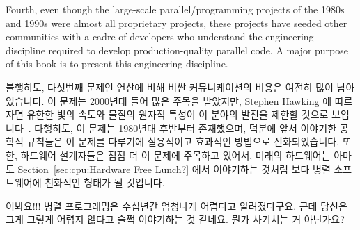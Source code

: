 Fourth, even though the large-scale parallel\-/programming projects of
the 1980s and 1990s were almost all proprietary projects, these
projects have seeded other communities with a cadre of developers who
understand the engineering discipline required to develop production-quality
parallel code.
A major purpose of this book is to present this engineering discipline.
\fi

불행히도, 다섯번째 문제인 연산에 비해 비싼 커뮤니케이션의 비용은 여전히 많이
남아있습니다.
이 문제는 2000년대 들어 많은 주목을 받았지만, Stephen Hawking 에 따르자면
유한한 빛의 속도와 물질의 원자적 특성이 이 분야의 발전을 제한할 것으로
보입니다~\cite{BryanGardiner2007,GordonMoore03a}.
다행히도, 이 문제는 1980년대 후반부터 존재했으며, 덕분에 앞서 이야기한 공학적
규칙들은 이 문제를 다루기에 실용적이고 효과적인 방법으로 진화되었습니다.
또한, 하드웨어 설계자들은 점점 더 이 문제에 주목하고 있어서, 미래의 하드웨어는
아마도 Section~\ref{sec:cpu:Hardware Free Lunch?} 에서 이야기하는 것처럼 보다
병렬 소프트웨어에 친화적인 형태가 될 것입니다.

\QuickQuiz{}
	이봐요!!!
	병렬 프로그래밍은 수십년간 엄청나게 어렵다고 알려졌다구요.
	근데 당신은 그게 그렇게 어렵지 않다고 슬쩍 이야기하는 것 같네요.
	뭔가 사기치는 거 아닌가요?
\iffalse

